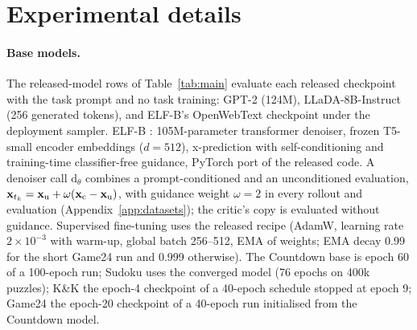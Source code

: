 \section{Experimental details}
\label{app:details}

\paragraph{Base models.} The released-model rows of Table~\ref{tab:main} evaluate each released checkpoint with the task prompt and no task training: GPT-2 (124M), LLaDA-8B-Instruct (256 generated tokens), and ELF-B's OpenWebText checkpoint under the deployment sampler.
ELF-B \citep{hu2026elf}: 105M-parameter transformer denoiser, frozen T5-small \citep{raffel2020t5} encoder embeddings ($d{=}512$), x-prediction with self-conditioning and training-time classifier-free guidance, PyTorch port of the released code. A denoiser call $\mathrm d_\theta$ combines a prompt-conditioned and an unconditioned evaluation, ${\mathbf{x}}_{t_k}={\mathbf{x}}_{\rm u}+\omega({\mathbf{x}}_{\rm c}-{\mathbf{x}}_{\rm u})$, with guidance weight $\omega=2$ in every rollout and evaluation (Appendix~\ref{app:datasets}); the critic's copy is evaluated without guidance. Supervised fine-tuning uses the released recipe (AdamW, learning rate $2\times10^{-3}$ with warm-up, global batch 256--512, EMA of weights; EMA decay 0.99 for the short Game24 run and 0.999 otherwise). The Countdown base is epoch 60 of a 100-epoch run; Sudoku uses the converged model (76 epochs on 400k puzzles); K\&K the epoch-4 checkpoint of a 40-epoch schedule stopped at epoch 9; Game24 the epoch-20 checkpoint of a 40-epoch run initialised from the Countdown model.

